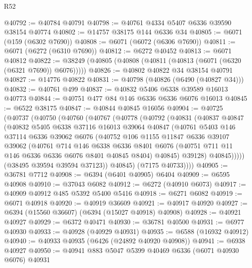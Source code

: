 \begin{lexlean}{R52}
\begin{coremodule}
@40792 := @40784 @40791
@40798 := @40761 @4334 @5407 @6336 @39590 @38154 @40774
@40802 := @14757 @38175 @144 @6336 @34
@40805 := @6071 (@159 (@6302 @7690))
@40808 := @6071 (@6072 (@6306 @7690))
@40811 := @6071 (@6272 (@6310 @7690))
@40812 := @6272 @40452
@40813 := @6071 @40812
@40822 := @38249 (@40805 (@40808 (@40811 (@40813 (@6071 (@6320 (@6321 @7690)) @6076)))))
@40826 := @40802 @40822 @34 @38154 @40791
@40827 := @14776 @40822
@40831 := @40798 (@40826 (@6490 (@40827 @34)))
@40832 := @40761 @499
@40837 := @40832 @5406 @6338 @39589 @16013 @40773
@40844 := @40751 @477 @84 @146 @6336 @6336 @6076 @16013
@40845 := @6522 @38175
@40847 := @40844 @40845 @16056
@40904 := @40725
    (@40737
      (@40750
        (@40760
          (@40767
            (@40778
              (@40792
                (@40831
                  (@40837
                    @40847
                    (@40832
                      @5405
                      @6338
                      @37116
                      @16013
                      @39064
                      @40847
                      (@40761
                        @5403
                        @146
                        @37114
                        @6336
                        @39062
                        @6076
                        (@40752
                          @106
                          @1155
                          @11847
                          @6336
                          @39107
                          @39062
                          (@40761
                            @714
                            @146
                            @6338
                            @6336
                            @8401
                            @6076
                            (@40751 @711 @11 @146 @6336 @6336 @6076 @8401 @40845 @8404)
                            @40845)
                          @39128)
                        @40845)))))
              (@38495 @39594 @39594 @37123))
            @40845)
          (@7175 @40733))))
@40905 := @36781 @7712
@40908 := @6394 (@6401 @40905) @6404
@40909 := @6595 @40908
@40910 := @37043 @6082
@40912 := @6272 (@40910 @6073)
@40917 := @40909 @40912 @485 @5392 @5400 @5416
@40918 := @6271 @6082
@40919 := @6071 @40918
@40920 := @40919 @36609
@40921 := @40917 @40920
@40927 := @6394 (@15560 @36607) (@6394 (@15027 @40918) @40908)
@40928 := @40921 @40927
@40929 := @6372 @40471
@40930 := @36781 @40500
@40931 := @6977 @40930
@40933 := @40928 (@40929 @40931)
@40935 := @6588 (@16932 @40912)
@40940 := @40933 @40935 (@6426 (@24892 @40920 @40908))
@40941 := @6938 @40927
@40950 := @40941 @883 @5047 @5399 @40469 @6336 (@6071 @40930 @6076) @40931

\end{coremodule}
\end{lexlean}
